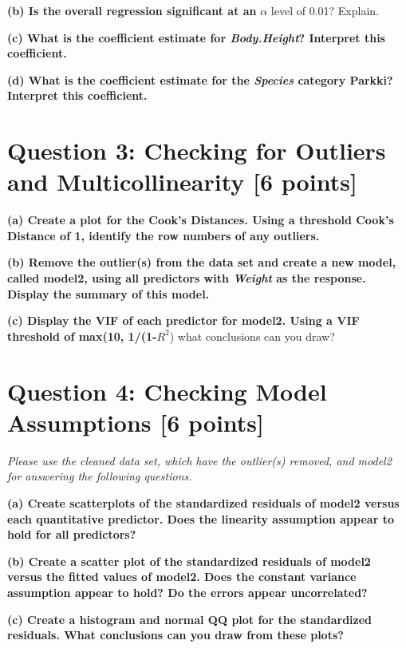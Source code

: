 \documentclass[
]{article}
\begin{document}
\textbf{(b) Is the overall regression significant at an} \(\alpha\)
level of 0.01? Explain.

\textbf{(c) What is the coefficient estimate for \emph{Body.Height}?
Interpret this coefficient.}

\textbf{(d) What is the coefficient estimate for the \emph{Species}
category Parkki? Interpret this coefficient.}

\hypertarget{question-3-checking-for-outliers-and-multicollinearity-6-points}{%
\section{Question 3: Checking for Outliers and Multicollinearity {[}6
points{]}}\label{question-3-checking-for-outliers-and-multicollinearity-6-points}}

\textbf{(a) Create a plot for the Cook's Distances. Using a threshold
Cook's Distance of 1, identify the row numbers of any outliers.}

\textbf{(b) Remove the outlier(s) from the data set and create a new
model, called model2, using all predictors with \emph{Weight} as the
response. Display the summary of this model.}

\textbf{(c) Display the VIF of each predictor for model2. Using a VIF
threshold of max(10, 1/(1-}\(R^2\)) what conclusions can you draw?

\hypertarget{question-4-checking-model-assumptions-6-points}{%
\section{Question 4: Checking Model Assumptions {[}6
points{]}}\label{question-4-checking-model-assumptions-6-points}}

\emph{Please use the cleaned data set, which have the outlier(s)
removed, and model2 for answering the following questions.}

\textbf{(a) Create scatterplots of the standardized residuals of model2
versus each quantitative predictor. Does the linearity assumption appear
to hold for all predictors?}

\textbf{(b) Create a scatter plot of the standardized residuals of
model2 versus the fitted values of model2. Does the constant variance
assumption appear to hold? Do the errors appear uncorrelated?}

\textbf{(c) Create a histogram and normal QQ plot for the standardized
residuals. What conclusions can you draw from these plots?}
\end{document}

